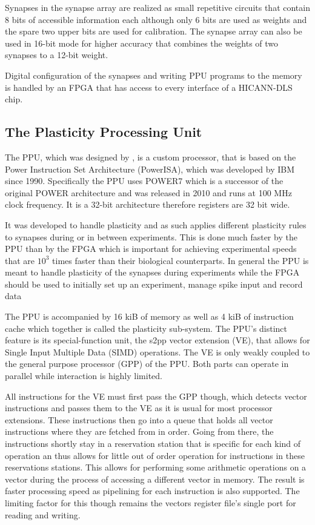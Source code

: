 Synapses in the synapse array are realized as small repetitive circuits that contain 8 bits of accessible information each although only 6 bits are used as weights and the spare two upper bits are used for calibration.
The synapse array can also be used in 16-bit mode for higher accuracy that combines the weights of two synapses to a 12-bit weight.

Digital configuration of the synapses and writing PPU programs to the memory is handled by an FPGA that has access to every interface of a HICANN-DLS chip.

\subsection{The Plasticity Processing Unit}
The PPU, which was designed by \citep{PPU}, is a custom processor, that is based on the Power Instruction Set Architecture (PowerISA), which was developed by IBM since 1990. 
Specifically the PPU uses POWER7 which is a successor of the original POWER architecture and was released in 2010 and runs at 100 MHz clock frequency.
It is a 32-bit architecture therefore registers are 32 bit wide.

It was developed to handle plasticity and as such applies different plasticity rules to synapses during or in between experiments.
This is done much faster by the PPU than by the FPGA which is important for achieving experimental speeds that are $10^{3}$ times faster than their biological counterparts.
In general the PPU is meant to handle plasticity of the synapses during experiments while the FPGA should be used to initially set up an experiment, manage spike input and record data 

The PPU is accompanied by 16 kiB of memory as well as 4 kiB of instruction cache which together is called the plasticity sub-system.
The PPU's distinct feature is its special-function unit, the s2pp vector extension (VE), that allows for Single Input Multiple Data (SIMD) operations.
The VE is only weakly coupled to the general purpose processor (GPP) of the PPU.
Both parts can operate in parallel while interaction is highly limited.

All instructions for the VE must first pass the GPP though, which detects vector instructions and passes them to the VE as it is usual for most processor extensions.
These instructions then go into a queue that holds all vector instructions where they are fetched from in order.
Going from there, the instructions shortly stay in a reservation station that is specific for each kind of operation an thus allows for little out of order operation for instructions in these reservations stations.
This allows for performing some arithmetic operations on a vector during the process of accessing a different vector in memory.
The result is faster processing speed as pipelining for each instruction is also supported.
The limiting factor for this though remains the vectors register file's single port for reading and writing.

